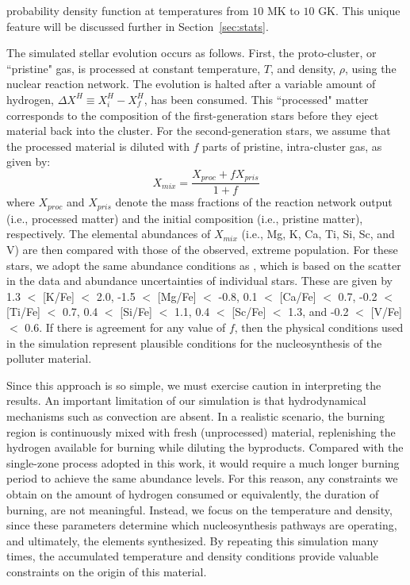 \documentclass[twocolumn]{aastex6}
\newcommand{\abundance}[1]{[{#1}/Fe]}
\begin{document}
probability density function at temperatures from $10$ MK to $10$ GK. This unique feature will be discussed further in Section~\ref{sec:stats}.
\par
The simulated stellar evolution occurs as follows. First, the proto-cluster, or ``pristine" gas, is processed at constant temperature, $T$, and density, $\rho$,  using the nuclear reaction network. The evolution is halted after a variable amount of hydrogen, $\Delta X^H\equiv X_{i}^H-X_{f}^H$, has been consumed. This ``processed" matter corresponds to the composition of the first-generation stars before they eject material back into the cluster. For the second-generation stars, we assume that the processed material is diluted with $f$ parts of pristine, intra-cluster gas, as given by:
\begin{equation}
X_{mix} = \frac{X_{proc} + f X_{pris}}{1+f}
\end{equation}
where $X_{proc}$ and $X_{pris}$ denote the mass fractions of the reaction network output (i.e., processed matter) and the initial composition (i.e., pristine matter), respectively. 
The elemental abundances of $X_{mix}$ (i.e., Mg, K, Ca, Ti, Si, Sc, and V) are then compared with those of the observed, extreme population. 
For these stars, we adopt the same abundance conditions as \cite{Iliadis_2016}, which is based on the scatter in the data and abundance uncertainties of individual stars. These are given by 1.3 $<$ \abundance{K} $<$ 2.0, -1.5 $<$ \abundance{Mg} $<$ -0.8, 0.1 $<$ \abundance{Ca} $<$ 0.7, -0.2 $<$ \abundance{Ti} $<$ 0.7, 0.4 $<$ \abundance{Si} $<$ 1.1, 0.4 $<$ \abundance{Sc} $<$ 1.3, and -0.2 $<$ \abundance{V} $<$ 0.6.
If there is agreement for any value of $f$, then the physical conditions used in the simulation represent plausible conditions for the nucleosynthesis of the polluter material. 

\par
Since this approach is so simple, we must exercise caution in interpreting the results. An important limitation of our simulation is that hydrodynamical mechanisms such as convection are absent. In a realistic scenario, the burning region is continuously mixed with fresh (unprocessed) material, replenishing the hydrogen available for burning while diluting the byproducts. Compared with the single-zone process adopted in this work, it would require a much longer burning period to achieve the same abundance levels. For this reason, any constraints we obtain on the amount of hydrogen consumed or equivalently, the duration of burning, are not meaningful. Instead, we focus on the temperature and density, since these parameters determine which nucleosynthesis pathways are operating, and ultimately, the elements synthesized. By repeating this simulation many times, the accumulated temperature and density conditions provide valuable constraints on the origin of this material.
\end{document}
